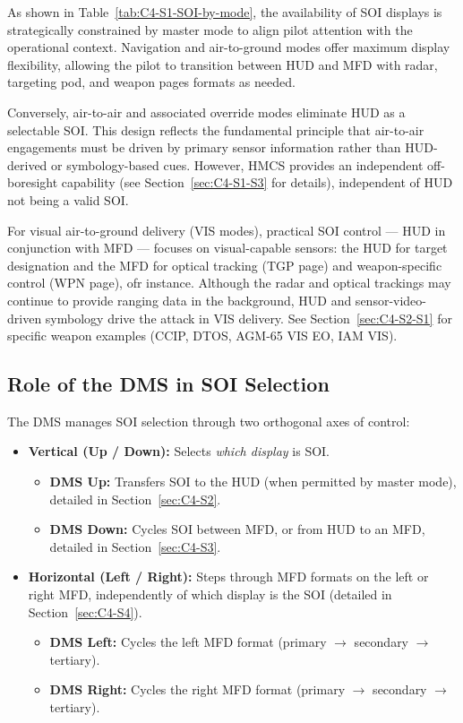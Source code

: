 \documentclass[11pt, a4paper, twoside]{report}
\begin{document}
As shown in Table~\ref{tab:C4-S1-SOI-by-mode}, the availability of SOI displays is strategically constrained by master mode to align pilot attention with the operational context. Navigation and air-to-ground modes offer maximum display flexibility, allowing the pilot to transition between HUD and MFD with radar, targeting pod, and weapon pages formats as needed.

Conversely, air-to-air and associated override modes eliminate HUD as a selectable SOI. This design reflects the fundamental principle that air-to-air engagements must be driven by primary sensor information rather than HUD-derived or symbology-based cues. However, HMCS provides an independent off-boresight capability (see Section~\ref{sec:C4-S1-S3} for details), independent of HUD not being a valid SOI.

For visual air-to-ground delivery (VIS modes), practical SOI control --- HUD in conjunction with MFD --- focuses on visual-capable sensors: the HUD for target designation and the MFD for optical tracking (TGP page) and weapon-specific control (WPN page), ofr instance. Although the radar and optical trackings may continue to provide ranging data in the background, HUD and sensor-video-driven symbology drive the attack in VIS delivery. See Section~\ref{sec:C4-S2-S1} for specific weapon examples (CCIP, DTOS, AGM-65 VIS EO, IAM VIS).

\subsection{Role of the DMS in SOI Selection}
\label{sec:C4-S1-S2}

The DMS manages SOI selection through two orthogonal axes of control:

\begin{itemize}
    \item \textbf{Vertical (Up / Down):} Selects \textit{which display} is SOI.
        \begin{itemize}
            \item \textbf{DMS Up:} Transfers SOI to the HUD (when permitted by master mode), detailed in Section~\ref{sec:C4-S2}.
            \item \textbf{DMS Down:} Cycles SOI between MFD, or from HUD to an MFD, detailed in Section~\ref{sec:C4-S3}.
        \end{itemize}
    \item \textbf{Horizontal (Left / Right):} Steps through MFD formats on the left or right MFD, independently of which display is the SOI (detailed in Section~\ref{sec:C4-S4}).
        \begin{itemize}
            \item \textbf{DMS Left:} Cycles the left MFD format (primary $\to$ secondary $\to$ tertiary).
            \item \textbf{DMS Right:} Cycles the right MFD format (primary $\to$ secondary $\to$ tertiary).
        \end{itemize}
\end{itemize}
\end{document}
